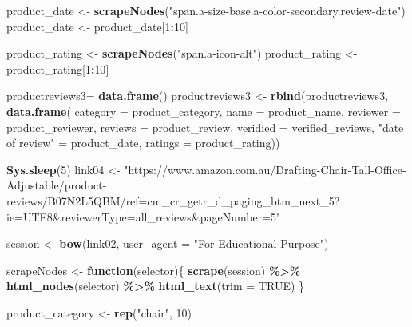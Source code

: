 \documentclass[
]{article}
\newenvironment{Shaded}{\begin{snugshade}}{\end{snugshade}}
\newcommand{\AttributeTok}[1]{\textcolor[rgb]{0.13,0.29,0.53}{#1}}
\newcommand{\ConstantTok}[1]{\textcolor[rgb]{0.56,0.35,0.01}{#1}}
\newcommand{\ControlFlowTok}[1]{\textcolor[rgb]{0.13,0.29,0.53}{\textbf{#1}}}
\newcommand{\DecValTok}[1]{\textcolor[rgb]{0.00,0.00,0.81}{#1}}
\newcommand{\FunctionTok}[1]{\textcolor[rgb]{0.13,0.29,0.53}{\textbf{#1}}}
\newcommand{\NormalTok}[1]{#1}
\newcommand{\OtherTok}[1]{\textcolor[rgb]{0.56,0.35,0.01}{#1}}
\newcommand{\SpecialCharTok}[1]{\textcolor[rgb]{0.81,0.36,0.00}{\textbf{#1}}}
\newcommand{\StringTok}[1]{\textcolor[rgb]{0.31,0.60,0.02}{#1}}
\begin{document}
\begin{Shaded}
\begin{Highlighting}[]
\NormalTok{  product\_date }\OtherTok{\textless{}{-}} \FunctionTok{scrapeNodes}\NormalTok{(}\StringTok{"span.a{-}size{-}base.a{-}color{-}secondary.review{-}date"}\NormalTok{)}
\NormalTok{  product\_date }\OtherTok{\textless{}{-}}\NormalTok{ product\_date[}\DecValTok{1}\SpecialCharTok{:}\DecValTok{10}\NormalTok{]}
  
\NormalTok{  product\_rating }\OtherTok{\textless{}{-}} \FunctionTok{scrapeNodes}\NormalTok{(}\StringTok{"span.a{-}icon{-}alt"}\NormalTok{)}
\NormalTok{  product\_rating }\OtherTok{\textless{}{-}}\NormalTok{ product\_rating[}\DecValTok{1}\SpecialCharTok{:}\DecValTok{10}\NormalTok{]}
  
\NormalTok{  productreviews3}\OtherTok{=} \FunctionTok{data.frame}\NormalTok{()}
\NormalTok{  productreviews3 }\OtherTok{\textless{}{-}} \FunctionTok{rbind}\NormalTok{(productreviews3, }\FunctionTok{data.frame}\NormalTok{(}
                      \AttributeTok{category =}\NormalTok{ product\_category,}
                      \AttributeTok{name =}\NormalTok{ product\_name,}
                      \AttributeTok{reviewer =}\NormalTok{ product\_reviewer,}
                      \AttributeTok{reviews =}\NormalTok{ product\_review,}
                      \AttributeTok{veridied =}\NormalTok{ verified\_reviews,}
                      \StringTok{"date of review"} \OtherTok{=}\NormalTok{ product\_date,}
                      \AttributeTok{ratings =}\NormalTok{ product\_rating))}
  
   \FunctionTok{Sys.sleep}\NormalTok{(}\DecValTok{5}\NormalTok{)}
\NormalTok{link04 }\OtherTok{\textless{}{-}} \StringTok{"https://www.amazon.com.au/Drafting{-}Chair{-}Tall{-}Office{-}Adjustable/product{-}reviews/B07N2L5QBM/ref=cm\_cr\_getr\_d\_paging\_btm\_next\_5?ie=UTF8\&reviewerType=all\_reviews\&pageNumber=5"}


\NormalTok{  session }\OtherTok{\textless{}{-}} \FunctionTok{bow}\NormalTok{(link02,}
               \AttributeTok{user\_agent =} \StringTok{"For Educational Purpose"}\NormalTok{)}

\NormalTok{  scrapeNodes }\OtherTok{\textless{}{-}} \ControlFlowTok{function}\NormalTok{(selector)\{}
    \FunctionTok{scrape}\NormalTok{(session) }\SpecialCharTok{\%\textgreater{}\%}
      \FunctionTok{html\_nodes}\NormalTok{(selector) }\SpecialCharTok{\%\textgreater{}\%}
      \FunctionTok{html\_text}\NormalTok{(}\AttributeTok{trim =} \ConstantTok{TRUE}\NormalTok{)}
\NormalTok{  \}}

\NormalTok{  product\_category }\OtherTok{\textless{}{-}} \FunctionTok{rep}\NormalTok{(}\StringTok{"chair"}\NormalTok{, }\DecValTok{10}\NormalTok{)}


\end{Highlighting}
\end{Shaded}
\end{document}
